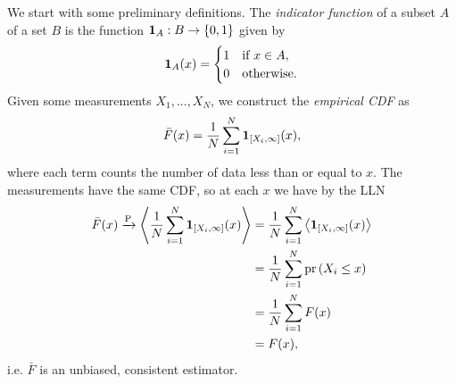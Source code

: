 We start with some preliminary definitions. The {\it indicator function}
 of a subset $A$ of a set $B$ is
the function ${\mathbf 1}_A:B\to\{0,1\}$ given by
\begin{equation}
  {\mathbf 1}_A(x)=\begin{cases}
    1 & \text{if } x\in A, \\
    0 & \text{otherwise}.
  \end{cases}
\end{equation}
Given some measurements $X_1,...,X_N$, we construct
the {\it empirical CDF} as
\begin{equation}\label{eq:empcdf}
  \bar{F}(x)=\frac{1}{N}\sum_{i=1}^N{\mathbf 1}_{[X_i,\infty]}(x),
\end{equation}
where each term counts the number of data less than
or equal to $x$.
The measurements have the same CDF, so at each $x$
we have by the LLN
\begin{equation}\label{eq:empcdfconv}
  \begin{aligned}
  \bar{F}(x)\xrightarrow{\text{P}}
    \ev{\frac{1}{N}\sum_{i=1}^N\id_{[X_i,\infty]}(x)}
    &=\frac{1}{N}\sum_{i=1}^N\ev{\id_{[X_i,\infty]}(x)}\\
    &=\frac{1}{N}\sum_{i=1}^N\pr{X_i\leq x}\\
    &=\frac{1}{N}\sum_{i=1}^NF(x)\\
    &=F(x),
  \end{aligned}
\end{equation}
i.e. $\bar{F}$ is an unbiased, consistent estimator. 

